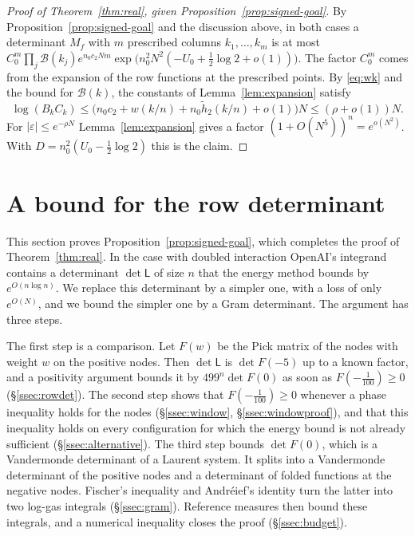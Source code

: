 \documentclass[11pt]{amsart}
\theoremstyle{definition}
\theoremstyle{remark}
\numberwithin{equation}{section}
\begin{document}
\begin{proof}[Proof of Theorem~\ref{thm:real}, given Proposition~\ref{prop:signed-goal}]
By Proposition~\ref{prop:signed-goal} and the discussion above, in both cases a determinant $M_f$ with $m$
prescribed columns $k_1,\ldots,k_m$ is at most
$C_0^m\prod_j\mathcal B(k_j)e^{n_0c_2Nm}\exp\bigl(n_0^2N^2(-U_0+\frac12\log2+o(1))\bigr)$. The factor $C_0^m$ comes
from the expansion of the row functions at the prescribed points. By \eqref{eq:wk} and the bound for
$\mathcal B(k)$, the constants of Lemma~\ref{lem:expansion} satisfy
\[
 \log(B_kC_k)\le\bigl(n_0c_2+w(k/n)+n_0\tilde h_2(k/n)+o(1)\bigr)N\le(\rho+o(1))N .
\]
For $|\varepsilon|\le e^{-\rho N}$ Lemma~\ref{lem:expansion} gives a factor $(1+O(N^5))^n=e^{o(N^2)}$. With
$D=n_0^2(U_0-\frac12\log2)$ this is the claim.
\end{proof}
\section{A bound for the row determinant}\label{sec:signed}

This section proves Proposition~\ref{prop:signed-goal}, which completes the proof of Theorem~\ref{thm:real}.
In the case with doubled interaction OpenAI's integrand contains a determinant $\det\mathsf L$ of size $n$
that the energy method bounds by $e^{O(n\log n)}$. We replace this determinant by a simpler one, with a loss of only
$e^{O(N)}$, and we bound the simpler one by a Gram determinant. The argument has three steps.

The first step is a comparison. Let $F(w)$ be the Pick matrix of the nodes with weight $w$ on the positive
nodes. Then $\det\mathsf L$ is $\det F(-5)$ up to a known factor, and a positivity argument bounds it by
$499^n\det F(0)$ as soon as $F(-\frac1{100})\ge0$ (\S\ref{ssec:rowdet}). The second step shows that
$F(-\frac1{100})\ge0$ whenever a phase inequality holds for the nodes (\S\ref{ssec:window},
\S\ref{ssec:windowproof}), and that this inequality holds on every configuration for which the energy bound
is not already sufficient (\S\ref{ssec:alternative}). The third step bounds $\det F(0)$, which is a Vandermonde
determinant of a Laurent system. It splits into a Vandermonde determinant of the positive nodes and a
determinant of folded functions at the negative nodes. Fischer's inequality and Andr\'eief's identity turn
the latter into two log-gas integrals (\S\ref{ssec:gram}). Reference measures then bound these integrals,
and a numerical inequality closes the proof (\S\ref{ssec:budget}).
\end{document}
